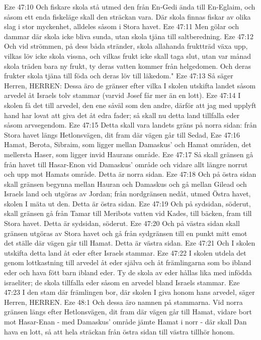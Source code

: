 Eze 47:10  Och fiskare skola stå utmed den från En-Gedi ända till En-Eglaim, och såsom ett enda fiskeläge skall den sträckan vara. Där skola finnas fiskar av olika slag i stor myckenhet, alldeles såsom i Stora havet.
Eze 47:11  Men gölar och dammar där skola icke bliva sunda, utan skola tjäna till saltberedning.
Eze 47:12  Och vid strömmen, på dess båda stränder, skola allahanda fruktträd växa upp, vilkas löv icke skola vissna, och vilkas frukt icke skall taga slut, utan var månad skola träden bara ny frukt, ty deras vatten kommer från helgedomen. Och deras frukter skola tjäna till föda och deras löv till läkedom."
Eze 47:13  Så säger Herren, HERREN: Dessa äro de gränser efter vilka I skolen utskifta landet såsom arvedel åt Israels tolv stammar (varvid Josef får mer än en lott).
Eze 47:14  I skolen få det till arvedel, den ene såväl som den andre, därför att jag med upplyft hand har lovat att giva det åt edra fader; så skall nu detta land tillfalla eder såsom arvsegendom.
Eze 47:15  Detta skall vara landets gräns på norra sidan: från Stora havet längs Hetlonsvägen, dit fram där vägen går till Sedad,
Eze 47:16  Hamat, Berota, Sibraim, som ligger mellan Damaskus' och Hamat områden, det mellersta Haser, som ligger invid Haurans område.
Eze 47:17  Så skall gränsen gå från havet till Hasar-Enon vid Damaskus' område och vidare allt längre norrut och upp mot Hamats område. Detta är norra sidan.
Eze 47:18  Och på östra sidan skall gränsen begynna mellan Hauran och Damaskus och gå mellan Gilead och Israels land och utgöras av Jordan; från nordgränsen nedåt, utmed Östra havet, skolen I mäta ut den. Detta är östra sidan.
Eze 47:19  Och på sydsidan, söderut, skall gränsen gå från Tamar till Meribots vatten vid Kades, till bäcken, fram till Stora havet. Detta är sydsidan, söderut.
Eze 47:20  Och på västra sidan skall gränsen utgöras av Stora havet och gå från sydgränsen till en punkt mitt emot det ställe där vägen går till Hamat. Detta är västra sidan.
Eze 47:21  Och I skolen utskifta detta land åt eder efter Israels stammar.
Eze 47:22  I skolen utdela det genom lottkastning till arvedel åt eder själva och åt främlingarna som bo ibland eder och hava fött barn ibland eder. Ty de skola av eder hållas lika med infödda israeliter; de skola tillfalla eder såsom en arvedel bland Israels stammar.
Eze 47:23  I den stam där främlingen bor, där skolen I giva honom hans arvedel, säger Herren, HERREN.
Eze 48:1  Och dessa äro namnen på stammarna. Vid norra gränsen längs efter Hetlonsvägen, dit fram där vägen går till Hamat, vidare bort mot Hasar-Enan - med Damaskus' område jämte Hamat i norr - där skall Dan hava en lott, så att hela sträckan från östra sidan till västra tillhör honom.

